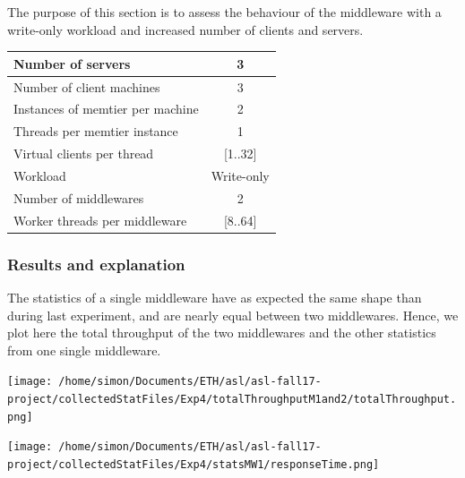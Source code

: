 \documentclass[11pt,a4paper]{article}
\begin{document}
The purpose of this section is to assess the behaviour of the middleware with a write-only workload and increased number of clients and servers.

\begin{center}
	\scriptsize{
		\begin{tabular}{|l|c|}
			\hline Number of servers                & 3          \\ 
			\hline Number of client machines        & 3          \\ 
			\hline Instances of memtier per machine & 2          \\ 
			\hline Threads per memtier instance     & 1          \\
			\hline Virtual clients per thread       & [1..32]    \\ 
			\hline Workload                         & Write-only \\
			\hline Number of middlewares            & 2          \\
			\hline Worker threads per middleware    & [8..64]    \\
			\hline 
		\end{tabular}
	} 
\end{center}

\subsubsection{Results and explanation}

The statistics of a single middleware have as expected the same shape than during last experiment, and are nearly equal between two middlewares. Hence, we plot here the total throughput of the two middlewares and the other statistics from one single middleware. 

\begin{center}
\texttt{[image: /home/simon/Documents/ETH/asl/asl-fall17-project/collectedStatFiles/Exp4/totalThroughputM1and2/totalThroughput.png]}
\end{center}
 \begin{center}
\texttt{[image: /home/simon/Documents/ETH/asl/asl-fall17-project/collectedStatFiles/Exp4/statsMW1/responseTime.png]}
\end{center}
\end{document}
